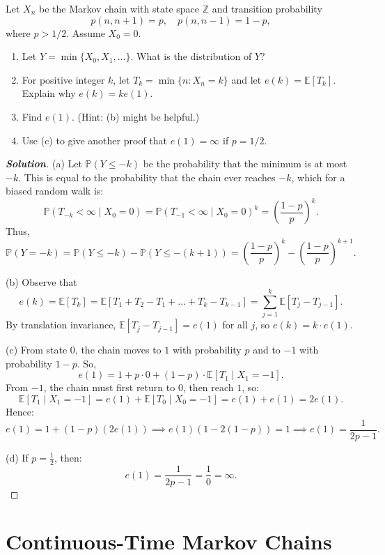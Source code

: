 \documentclass[12pt]{book}
\newenvironment{problem}[2][Problem]{\begin{trivlist}
\item[\hskip \labelsep {\bfseries #1}\hskip \labelsep {\bfseries #2.}]}{\end{trivlist}}
\newenvironment{solution}
               {\let\oldqedsymbol=\qedsymbol
                \renewcommand{\qedsymbol}{$\square$}
                \begin{proof}[\bfseries\upshape Solution]}
               {\end{proof}
                \renewcommand{\qedsymbol}{\oldqedsymbol}}
\begin{document}
\begin{problem}{2.5}
Let $X_n$ be the Markov chain with state space $\mathbb{Z}$ and transition probability
\[
p(n, n+1) = p, \quad p(n, n-1) = 1-p,
\]
where $p > 1/2$. Assume $X_0 = 0$.

\begin{enumerate}
    \item[(a)] Let $Y = \min\{ X_0, X_1, \ldots \}$. What is the distribution of $Y$?
    \item[(b)] For positive integer $k$, let $T_k = \min\{ n : X_n = k \}$ and let $e(k) = \mathbb{E}[T_k]$. Explain why $e(k) = k e(1)$.
    \item[(c)] Find $e(1)$. (Hint: (b) might be helpful.)
    \item[(d)] Use (c) to give another proof that $e(1) = \infty$ if $p = 1/2$.
\end{enumerate}
\end{problem}
\begin{solution}
(a) Let $\mathbb{P}(Y \leq -k)$ be the probability that the minimum is at most $-k$. This is equal to the probability that the chain ever reaches $-k$, which for a biased random walk is:
\[
\mathbb{P}(T_{-k} < \infty \mid X_0 = 0) = \mathbb{P}(T_{-1} < \infty \mid X_0 = 0)^k = \left( \frac{1-p}{p} \right)^k.
\]
Thus,
\[
\mathbb{P}(Y = -k) = \mathbb{P}(Y \leq -k) - \mathbb{P}(Y \leq -(k+1)) = \left( \frac{1-p}{p} \right)^k - \left( \frac{1-p}{p} \right)^{k+1}.
\]

(b) Observe that
\[
e(k) = \mathbb{E}[T_k] = \mathbb{E}[T_1 + T_2 - T_1 + \ldots + T_k - T_{k-1}] = \sum_{j=1}^k \mathbb{E}[T_j - T_{j-1}].
\]
By translation invariance, $\mathbb{E}[T_j - T_{j-1}] = e(1)$ for all $j$, so $e(k) = k \cdot e(1)$.

(c) From state $0$, the chain moves to $1$ with probability $p$ and to $-1$ with probability $1-p$. So,
\[
e(1) = 1 + p \cdot 0 + (1-p) \cdot \mathbb{E}[T_1 \mid X_1 = -1].
\]
From $-1$, the chain must first return to $0$, then reach $1$, so:
\[
\mathbb{E}[T_1 \mid X_1 = -1] = e(1) + \mathbb{E}[T_0 \mid X_0 = -1] = e(1) + e(1) = 2e(1).
\]
Hence:
\[
e(1) = 1 + (1-p)(2e(1)) \implies e(1)(1 - 2(1-p)) = 1 \implies e(1) = \frac{1}{2p-1}.
\]

(d) If $p = \frac{1}{2}$, then:
\[
e(1) = \frac{1}{2p-1} = \frac{1}{0} = \infty.
\]
\end{solution}


\chapter{Continuous-Time Markov Chains}
\end{document}

